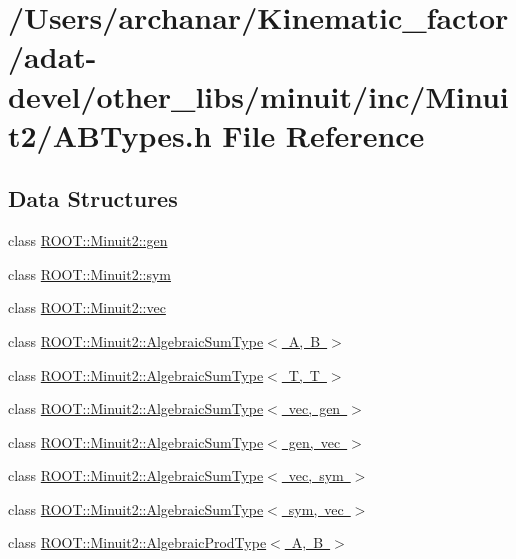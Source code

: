 \hypertarget{adat-devel_2other__libs_2minuit_2inc_2Minuit2_2ABTypes_8h}{}\section{/\+Users/archanar/\+Kinematic\+\_\+factor/adat-\/devel/other\+\_\+libs/minuit/inc/\+Minuit2/\+A\+B\+Types.h File Reference}
\label{adat-devel_2other__libs_2minuit_2inc_2Minuit2_2ABTypes_8h}
\subsection*{Data Structures}
\begin{DoxyCompactItemize}
\item 
class \mbox{\hyperlink{classROOT_1_1Minuit2_1_1gen}{R\+O\+O\+T\+::\+Minuit2\+::gen}}
\item 
class \mbox{\hyperlink{classROOT_1_1Minuit2_1_1sym}{R\+O\+O\+T\+::\+Minuit2\+::sym}}
\item 
class \mbox{\hyperlink{classROOT_1_1Minuit2_1_1vec}{R\+O\+O\+T\+::\+Minuit2\+::vec}}
\item 
class \mbox{\hyperlink{classROOT_1_1Minuit2_1_1AlgebraicSumType}{R\+O\+O\+T\+::\+Minuit2\+::\+Algebraic\+Sum\+Type$<$ A, B $>$}}
\item 
class \mbox{\hyperlink{classROOT_1_1Minuit2_1_1AlgebraicSumType_3_01T_00_01T_01_4}{R\+O\+O\+T\+::\+Minuit2\+::\+Algebraic\+Sum\+Type$<$ T, T $>$}}
\item 
class \mbox{\hyperlink{classROOT_1_1Minuit2_1_1AlgebraicSumType_3_01vec_00_01gen_01_4}{R\+O\+O\+T\+::\+Minuit2\+::\+Algebraic\+Sum\+Type$<$ vec, gen $>$}}
\item 
class \mbox{\hyperlink{classROOT_1_1Minuit2_1_1AlgebraicSumType_3_01gen_00_01vec_01_4}{R\+O\+O\+T\+::\+Minuit2\+::\+Algebraic\+Sum\+Type$<$ gen, vec $>$}}
\item 
class \mbox{\hyperlink{classROOT_1_1Minuit2_1_1AlgebraicSumType_3_01vec_00_01sym_01_4}{R\+O\+O\+T\+::\+Minuit2\+::\+Algebraic\+Sum\+Type$<$ vec, sym $>$}}
\item 
class \mbox{\hyperlink{classROOT_1_1Minuit2_1_1AlgebraicSumType_3_01sym_00_01vec_01_4}{R\+O\+O\+T\+::\+Minuit2\+::\+Algebraic\+Sum\+Type$<$ sym, vec $>$}}
\item 
class \mbox{\hyperlink{classROOT_1_1Minuit2_1_1AlgebraicProdType}{R\+O\+O\+T\+::\+Minuit2\+::\+Algebraic\+Prod\+Type$<$ A, B $>$}}

\end{DoxyCompactItemize}
